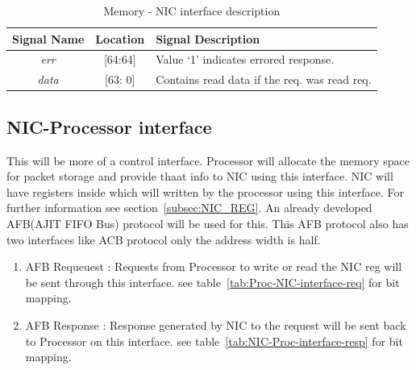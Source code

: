 \documentclass[12pt]{report}
\begin{document}
				\begin{table}[!htbp]
					\centering
					\begin{tabular}{ccl}
						\hline
						\textbf{Signal Name} 		& \textbf{Location} 		&\textbf{Signal Description}  \\ \hline
						\textit{err}			& [64:64]			& Value `1' indicates errored response.\\\hline
						\textit{data}   		& [63: 0] 			& Contains read data if the req. was read req.\\ \hline
					\end{tabular}
					\caption{Memory - NIC interface description}
					\label{tab:Memory-NIC-interface-resp}
				\end{table}
			
		\subsection{NIC-Processor interface} \label{AFB}
			This will be more of a control interface. Processor will allocate the memory space for packet storage and provide thaat info to NIC using this interface.
			NIC will have registers inside which will written by the processor using this interface. For further information see section~\ref{subsec:NIC_REG}. An already developed
			AFB(AJIT FIFO Bus) protocol will be used for this. This AFB protocol also has two interfaces like ACB protocol only the address width is half.

			\begin{enumerate}
				\item AFB Requeuest : Requests from Processor to write or read the NIC reg will be sent through this interface. see table~\ref{tab:Proc-NIC-interface-req} for bit mapping.
				\item AFB Response : Response generated by NIC to the request will be sent back to Processor on this interface. see table~\ref{tab:NIC-Proc-interface-resp} for bit mapping.
			\end{enumerate}
\end{document}

